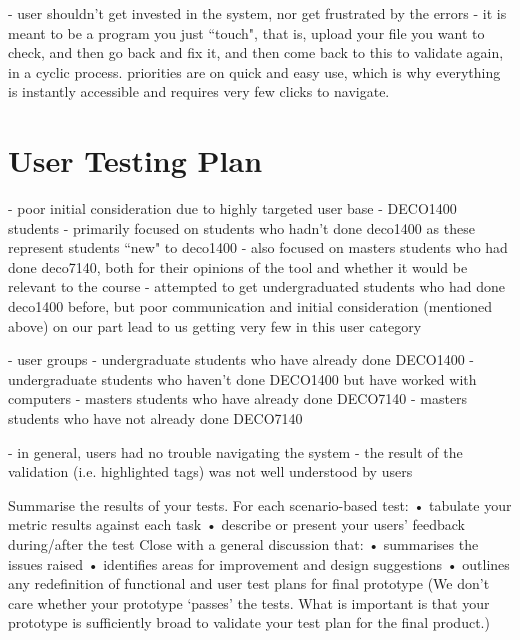 \documentclass[10pt]{article}
\begin{document}
- user shouldn't get invested in the system, nor get frustrated by the errors
- it is meant to be a program you just ``touch", that is, upload your file you want to check, and then go back and fix it, and then come back to this to validate again, in a cyclic process. priorities are on quick and easy use, which is why everything is instantly accessible and requires very few clicks to navigate.

\newpage

\section*{User Testing Plan}

- poor initial consideration due to highly targeted user base - DECO1400 students
- primarily focused on students who hadn't done deco1400 as these represent students ``new" to deco1400
- also focused on masters students who had done deco7140, both for their opinions of the tool and whether it would be relevant to the course
- attempted to get undergraduated students who had done deco1400 before, but poor communication and initial consideration (mentioned above) on our part lead to us getting very few in this user category

- user groups
  - undergraduate students who have already done DECO1400
  - undergraduate students who haven't done DECO1400 but have worked with computers
  - masters students who have already done DECO7140
  - masters students who have not already done DECO7140

- in general, users had no trouble navigating the system
- the result of the validation (i.e. highlighted tags) was not well understood by users

Summarise the results of your tests. 
For each scenario-based test: 
• tabulate your metric results against each task 
• describe or present your users’ feedback during/after the test 
Close with a general discussion that: 
• summarises the issues raised 
• identifies areas for improvement and design suggestions 
• outlines any redefinition of functional and user test plans for final 
prototype 
(We don’t care whether your prototype ‘passes’ the tests. What is 
important is that your prototype is sufficiently broad to validate your test 
plan for the final product.)
\end{document}
